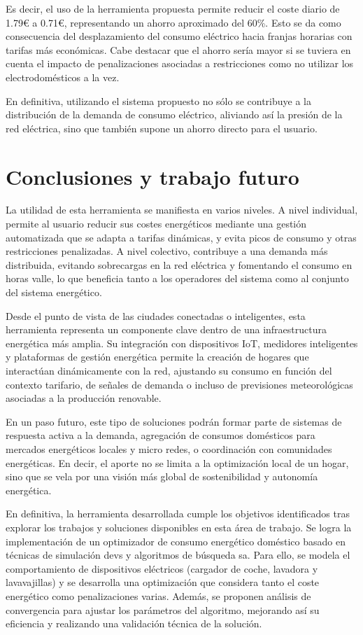 \documentclass[11pt,a4paper]{book}
\begin{document}
Es decir, el uso de la herramienta propuesta permite reducir el coste diario de 1.79\euro{} a 0.71\euro{}, representando un ahorro aproximado del 60\%. Esto se da como consecuencia del desplazamiento del consumo eléctrico hacia franjas horarias con tarifas más económicas. Cabe destacar que el ahorro sería mayor si se tuviera en cuenta el impacto de penalizaciones asociadas a restricciones como no utilizar los electrodomésticos a la vez. 

En definitiva, utilizando el sistema propuesto no sólo se contribuye a la distribución de la demanda de consumo eléctrico, aliviando así la presión de la red eléctrica, sino que también supone un ahorro directo para el usuario.
\chapter{Conclusiones y trabajo futuro}
La utilidad de esta herramienta se manifiesta en varios niveles. A nivel individual, permite al usuario reducir sus costes energéticos mediante una gestión automatizada que se adapta a tarifas dinámicas, y evita picos de consumo y otras restricciones penalizadas. A nivel colectivo, contribuye a una demanda más distribuida, evitando sobrecargas en la red eléctrica y fomentando el consumo en horas valle, lo que beneficia tanto a los operadores del sistema como al conjunto del sistema energético.

Desde el punto de vista de las ciudades conectadas o inteligentes, esta herramienta representa un componente clave dentro de una infraestructura energética más amplia. Su integración con dispositivos IoT, medidores inteligentes y plataformas de gestión energética permite la creación de hogares que interactúan dinámicamente con la red, ajustando su consumo en función del contexto tarifario, de señales de demanda o incluso de previsiones meteorológicas \mbox{asociadas} a la producción renovable.

En un paso futuro, este tipo de soluciones podrán formar parte de sistemas de respuesta activa a la demanda, agregación de consumos domésticos para mercados energéticos locales y micro redes, o coordinación con comunidades energéticas. En decir, el aporte no se limita a la optimización local de un hogar, sino que se vela por una visión más global de sostenibilidad y autonomía energética.

En definitiva, la herramienta desarrollada cumple los objetivos identificados tras explorar los trabajos y soluciones disponibles en esta área de trabajo. Se logra la implementación de un optimizador de consumo energético doméstico basado en técnicas de simulación \gls{devs} y algoritmos de búsqueda \gls{sa}. Para ello, se \mbox{modela} el comportamiento de dispositivos eléctricos (cargador de coche, lavadora y lavavajillas) y se desarrolla una optimización que considera tanto el coste energético como penalizaciones varias. Además, se proponen análisis de convergencia para ajustar los parámetros del algoritmo, mejorando así su eficiencia y realizando una validación técnica de la solución. 
\end{document}
